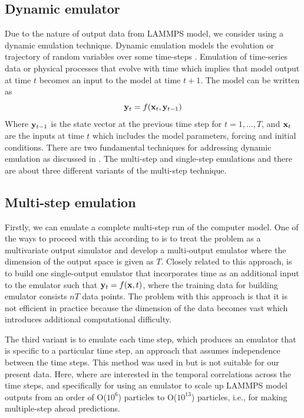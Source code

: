 \documentclass[12pt,titlepage]{report}
\newcommand{\bx}{{\bf x}}
\newcommand{\by}{{\bf y}}
\theoremstyle{definition}
\theoremstyle{remark}
\begin{document}
\subsection{Dynamic emulator}
Due to the nature of output data from LAMMPS model, we consider using a dynamic emulation technique. Dynamic emulation models the evolution or trajectory of random variables over some
time-steps \citep{pd12}. Emulation of time-series data or physical processes that evolve with time which implies that model output at time $t$ becomes an input to the model at time $t+1$. The model can be written as 
\begin{equation}\label{dyna3}
\by_t = f(\bx_t, \by_{t-1})
\end{equation}
Where $\by_{t-1}$ is the state vector at the previous time step for $t={1,\ldots,T}$, and $\bx_t$ are the inputs at time $t$ which includes the model parameters, forcing and initial conditions. There are two fundamental techniques for addressing dynamic emulation as discussed in \citep{pd12}. The multi-step and single-step emulations and there are about three different variants of the multi-step technique.


\subsection{Multi-step emulation}
Firstly, we can emulate a complete multi-step run of the computer model. One of the ways to proceed with this according to \citet{pd14} is to treat the problem as a multivariate output simulator and develop a multi-output emulator where the dimension of the output space is given as $T$. Closely related to this approach, is to build one single-output emulator that incorporates time as an additional input to the emulator such that $\by_t = f(\bx,t)$, where the training data for building emulator consists $nT$ data points. The problem with this approach is that it is not efficient in practice because the dimension of the data becomes vast which introduces additional computational difficulty. 

The third variant is to emulate each time step, which produces an emulator that is specific to a particular time step, an approach that assumes independence between the time steps. This method was used in \citet{pd27} but is not suitable for our present data. Here, where are interested in the temporal correlations across the time steps, and specifically for using an emulator to scale up LAMMPS model outputs from an order of O($10^6$) particles to O($10^{13}$) particles, i.e., for making multiple-step ahead predictions.
\end{document}
